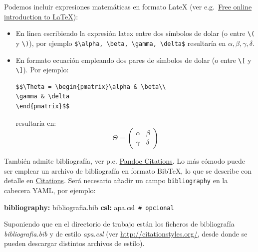 \documentclass[
]{book}
\newenvironment{Shaded}{\begin{snugshade}}{\end{snugshade}}
\newcommand{\AttributeTok}[1]{\textcolor[rgb]{0.13,0.29,0.53}{#1}}
\newcommand{\CommentTok}[1]{\textcolor[rgb]{0.56,0.35,0.01}{\textit{#1}}}
\newcommand{\FunctionTok}[1]{\textcolor[rgb]{0.13,0.29,0.53}{\textbf{#1}}}
\newcommand{\KeywordTok}[1]{\textcolor[rgb]{0.13,0.29,0.53}{\textbf{#1}}}
\theoremstyle{break}
\theoremstyle{nonumberplain}
\renewcommand{\CommentTok}[1]{\textcolor[rgb]{0.41,0.41,0.41}{\texttt{#1}}}
\begin{document}
Podemos incluir expresiones matemáticas en formato LateX (ver e.g.~\href{https://www.overleaf.com/learn/latex/Free_online_introduction_to_LaTeX_(part_1)}{Free online introduction to LaTeX}):

\begin{itemize}
\item
  En linea escribiendo la expresión latex entre dos símbolos de dolar (o entre \texttt{\textbackslash{}(} y \texttt{\textbackslash{})}),
  por ejemplo \texttt{\$\textbackslash{}alpha,\ \textbackslash{}beta,\ \textbackslash{}gamma,\ \textbackslash{}delta\$}
  resultaría en \(\alpha, \beta, \gamma, \delta\).
\item
  En formato ecuación empleando dos pares de símbolos de dolar (o entre \texttt{\textbackslash{}{[}} y \texttt{\textbackslash{}{]}}). Por ejemplo:

\begin{verbatim}
$$\Theta = \begin{pmatrix}\alpha & \beta\\
\gamma & \delta
\end{pmatrix}$$
\end{verbatim}

  resultaría en:
  \[\Theta = \begin{pmatrix}\alpha & \beta\\
  \gamma & \delta
  \end{pmatrix}\]
\end{itemize}

También admite bibliografía, ver p.e. \href{https://pandoc.org/MANUAL.html\#citations}{Pandoc Citations}.
Lo más cómodo puede ser emplear un archivo de bibliografía en formato BibTeX, lo que se describe con detalle en \href{https://bookdown.org/yihui/bookdown/citations.html}{Citations}.
Será necesario añadir un campo \texttt{bibliography} en la cabecera YAML, por ejemplo:

\begin{Shaded}
\begin{Highlighting}[]
\FunctionTok{bibliography}\KeywordTok{:}\AttributeTok{ bibliografia.bib}
\FunctionTok{csl}\KeywordTok{:}\AttributeTok{ apa.csl}\CommentTok{  \# opcional}
\end{Highlighting}
\end{Shaded}

Suponiendo que en el directorio de trabajo están los ficheros de bibliografía \emph{bibliografia.bib}
y de estilo \emph{apa.csl} (ver \url{http://citationstyles.org/}, desde donde se pueden descargar
distintos archivos de estilo).
\end{document}
